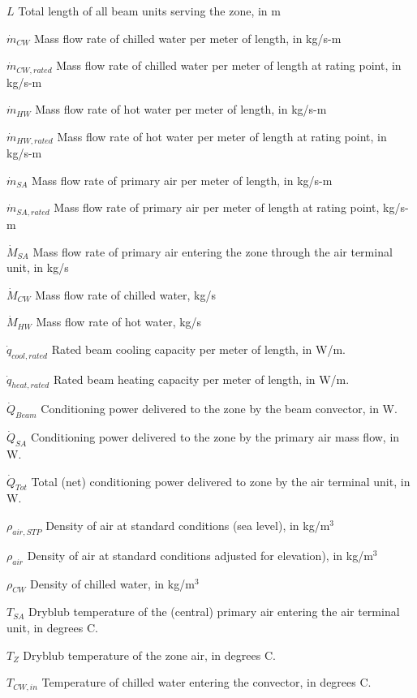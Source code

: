 \({L}\) Total length of all beam units serving the zone, in m

\({\dot m_{CW}}\) Mass flow rate of chilled water per meter of length, in kg/s-m

\({\dot m_{CW,rated}}\) Mass flow rate of chilled water per meter of length at rating point, in kg/s-m

\({\dot m_{HW}}\) Mass flow rate of hot water per meter of length, in kg/s-m

\({\dot m_{HW,rated}}\) Mass flow rate of hot water per meter of length at rating point, in kg/s-m

\({\dot m_{SA}}\) Mass flow rate of primary air per meter of length, in kg/s-m

\({\dot m_{SA,rated}}\) Mass flow rate of primary air per meter of length at rating point, kg/s-m

\({\dot M_{SA}}\) Mass flow rate of primary air entering the zone through the air terminal unit, in kg/s

\({\dot M_{CW}}\) Mass flow rate of chilled water, kg/s

\({\dot M_{HW}}\) Mass flow rate of hot water, kg/s

\({\dot q_{cool,rated}}\) Rated beam cooling capacity per meter of length, in W/m.

\({\dot q_{heat,rated}}\) Rated beam heating capacity per meter of length, in W/m.

\({\dot Q_{Beam}}\) Conditioning power delivered to the zone by the beam convector, in W.

\({\dot Q_{SA}}\) Conditioning power delivered to the zone by the primary air mass flow, in W.

\({\dot Q_{Tot}}\) Total (net) conditioning power delivered to zone by the air terminal unit, in W.

\({\rho_{air,STP}}\) Density of air at standard conditions (sea level), in kg/m\(^{3}\)

\({\rho_{air}}\) Density of air at standard conditions adjusted for elevation), in kg/m\(^{3}\)

\({\rho_{CW}}\) Density of chilled water, in kg/m\(^{3}\)

\({T_{SA}}\) Dryblub temperature of the (central) primary air entering the air terminal unit, in degrees C.

\({T_{Z}}\) Dryblub temperature of the zone air, in degrees C.

\({T_{CW,in}}\) Temperature of chilled water entering the convector, in degrees C.

